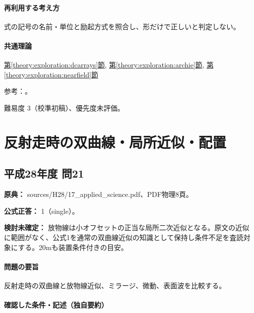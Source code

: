 \paragraph{再利用する考え方} 式の記号の名前・単位と励起方式を照合し、形だけで正しいと判定しない。

\paragraph{共通理論} \hyperref[theory:exploration:dcarrays]{第\ref*{theory:exploration:dcarrays}節}, \hyperref[theory:exploration:archie]{第\ref*{theory:exploration:archie}節}, \hyperref[theory:exploration:nearfield]{第\ref*{theory:exploration:nearfield}節}

\par 参考：\cite{epa_resistivity,usgs_csamt2012,epa_borehole_resistivity,epa_tdem_archive}。

\par 難易度 3（校準初稿）、優先度未評価。

\section{反射走時の双曲線・局所近似・配置}

\subsection{平成28年度 問21}
\label{q:h28-reg-applied-21}

\noindent\textbf{原典：} sources/H28/17\_applied\_science.pdf、PDF物理8頁。

\textbf{公式正答：} 1（single）。

\par\textbf{検討未確定：} 放物線は小オフセットの正当な局所二次近似となる。原文の近似に範囲がなく、公式1を通常の双曲線近似の知識として保持し条件不足を査読対象にする。20mも装置条件付きの目安。

\paragraph{問題の要旨} 反射走時の双曲線と放物線近似、ミラージ、微動、表面波を比較する。

\paragraph{確認した条件・記述（独自要約）}\mbox{}\par

